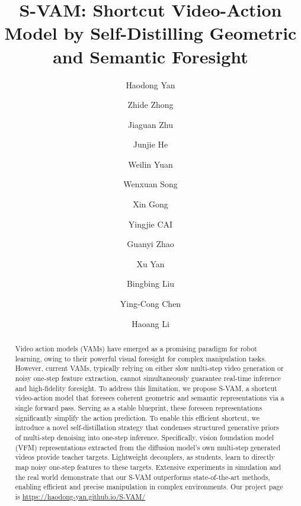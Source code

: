 \documentclass[runningheads]{llncs}
\begin{document}
\title{S-VAM: Shortcut Video-Action Model by Self-Distilling Geometric and Semantic Foresight} 




\author{Haodong Yan \and Zhide Zhong \and Jiaguan Zhu \and Junjie He \and Weilin Yuan \and Wenxuan Song \and Xin Gong \and Yingjie CAI \and Guanyi Zhao \and Xu Yan \and Bingbing Liu \and Ying-Cong Chen \and Haoang Li}




\maketitle



\begin{abstract}
Video action models (VAMs) have emerged as a promising paradigm for robot learning, owing to their powerful visual foresight for complex manipulation tasks. However, current VAMs, typically relying on either slow multi-step video generation or noisy one-step feature extraction, cannot simultaneously guarantee real-time inference and high-fidelity foresight. To address this limitation, we propose S-VAM, a shortcut video-action model that foresees coherent geometric and semantic representations via a single forward pass. Serving as a stable blueprint, these foreseen representations significantly simplify the action prediction. To enable this efficient shortcut, we introduce a novel self-distillation strategy that condenses structured generative priors of multi-step denoising into
one-step inference. Specifically, vision foundation model (VFM) representations extracted from the diffusion model's own multi-step generated videos provide teacher targets. Lightweight decouplers, as students, learn to directly map noisy one-step features to these targets. Extensive experiments in simulation and the real world demonstrate that our S-VAM outperforms state-of-the-art methods, enabling efficient and precise manipulation in complex environments. Our project page is \url{https://haodong-yan.github.io/S-VAM/}
\end{abstract}
\end{document}
